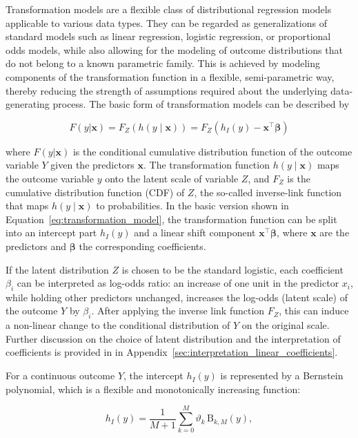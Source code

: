 Transformation models are a flexible class of distributional regression models applicable to various data types. They can be regarded as generalizations of standard models such as linear regression, logistic regression, or proportional odds models, while also allowing for the modeling of outcome distributions that do not belong to a known parametric family. This is achieved by modeling components of the transformation function in a flexible, semi-parametric way, thereby reducing the strength of assumptions required about the underlying data-generating process. The basic form of transformation models can be described by 

\begin{equation}
F(y|\mathbf{x}) = F_Z(h(y \mid \mathbf{x})) =  F_Z(h_I(y) - \mathbf{x}^\top \boldsymbol{\beta})
\label{eq:transformation_model}
\end{equation}

where $F(y|\mathbf{x})$ is the conditional cumulative distribution function of the outcome variable $Y$ given the predictors $\mathbf{x}$. The transformation function $h(y \mid \mathbf{x})$ maps the outcome variable $y$ onto the latent scale of variable $Z$, and $F_Z$ is the cumulative distribution function (CDF) of $Z$, the so-called inverse-link function that maps $h(y \mid \mathbf{x})$ to probabilities. In the basic version shown in Equation~\ref{eq:transformation_model}, the transformation function can be split into an intercept part $h_I(y)$ and a linear shift component $\mathbf{x}^\top \boldsymbol{\beta}$, where $\mathbf{x}$ are the predictors and $\boldsymbol{\beta}$ the corresponding coefficients.

If the latent distribution $Z$ is chosen to be the standard logistic, each coefficient $\beta_i$ can be interpreted as log-odds ratio: an increase of one unit in the predictor $x_i$, while holding other predictors unchanged, increases the log-odds (latent scale) of the outcome $Y$ by $\beta_i$. After applying the inverse link function $F_Z$, this can induce a non-linear change to the conditional distribution of $Y$ on the original scale. Further discussion on the choice of latent distribution and the interpretation of coefficients is provided in in Appendix~\ref{sec:interpretation_linear_coefficients}.

For a continuous outcome $Y$, the intercept $h_I(y)$ is represented by a Bernstein polynomial, which is a flexible and monotonically increasing function:

\begin{equation}
h_I(y) = \frac{1}{M + 1} \sum_{k=0}^{M} \vartheta_k \, \text{B}_{k, M}(y),
\label{eq:methods_bernstein_polynomial}
\end{equation}

